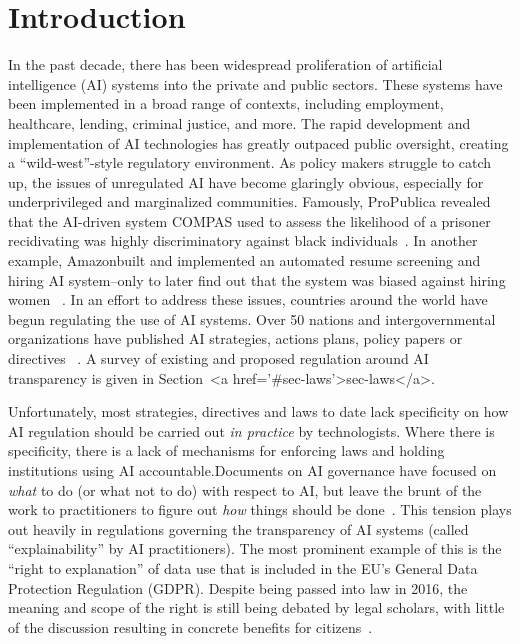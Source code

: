 \section{Introduction}
\label{sec:intro}

In the past decade, there has been widespread proliferation of artificial intelligence (AI) systems into the private and public sectors. These systems have been implemented in a broad range of contexts, including employment, healthcare, lending, criminal justice, and more. The rapid development and implementation of AI technologies has greatly outpaced public oversight, creating a ``wild-west''-style regulatory environment. As policy makers struggle to catch up, the issues of unregulated AI have become glaringly obvious, especially for underprivileged and marginalized communities. Famously, ProPublica revealed that the AI-driven system COMPAS used to assess the likelihood of a prisoner recidivating was highly discriminatory against black individuals~\cite{angwin2016machine}. In another example, Amazonbuilt and implemented an automated resume screening and hiring AI system--only to later find out that the system was biased against hiring women ~\cite{DBLP:journals/corr/abs-1909-03567}. In an effort to address these issues, countries around the world have begun regulating the use of AI systems. Over 50 nations and intergovernmental organizations have published AI strategies, actions plans, policy papers or directives ~\cite{unicri}. A survey of existing and proposed regulation around AI transparency is given in Section~<a href='#sec-laws'>sec-laws</a>.

Unfortunately, most strategies, directives and laws to date lack specificity on how AI regulation should be carried out \emph{in practice} by technologists. Where there is specificity, there is a lack of mechanisms for enforcing laws and holding institutions using AI accountable.Documents on AI governance have focused on \emph{what} to do (or what not to do) with respect to AI, but leave the brunt of the work to practitioners to figure out \emph{how} things should be done~\cite{DBLP:journals/corr/abs-1906-11668}. This tension plays out heavily in regulations governing the transparency of AI systems (called ``explainability'' by AI practitioners). The most prominent example of this is the ``right to explanation'' of data use that is included in the EU’s General Data Protection Regulation (GDPR). Despite being passed into law in 2016, the meaning and scope of the right is still being debated by legal scholars, with little of the discussion resulting in concrete benefits for citizens~\cite{DBLP:conf/fat/SelbstP18}.

